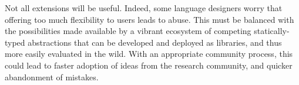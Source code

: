 \documentclass[9pt]{sigplanconf}
\begin{document}
%
% 
%
%

Not all extensions will be useful. Indeed, some language designers worry that offering too much flexibility to users leads to abuse. This must be balanced with the possibilities made available by a vibrant ecosystem of competing statically-typed abstractions that can be developed and deployed as libraries, and thus more easily evaluated in the wild. With an appropriate community process, this could lead to faster adoption of ideas from the research community, and quicker abandonment of mistakes. %
% 




\end{document}

